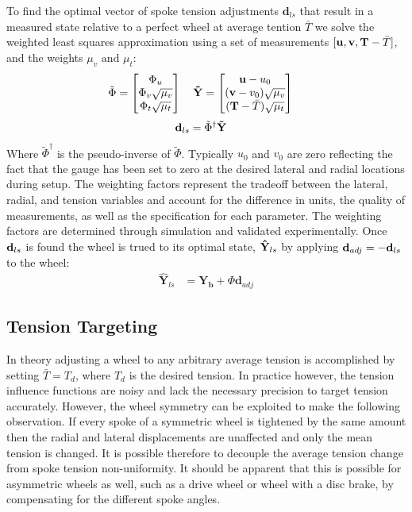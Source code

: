 \documentclass[journal]{IEEEtran}
\begin{document}
To find the optimal vector of spoke tension adjustments $\mathbf{d}_{ls}$ that result in a measured state relative to a perfect wheel at average tention $\bar T$ we solve the weighted least squares approximation using a set of measurements $ [ {\bf u,v,T}-\bar T ]$, and the weights $\mu_v \text{ and }\mu_t$:
\begin{align*}
    \tilde \Phi &= \begin{bmatrix}
    \Phi_u\\
    \Phi_v \sqrt {\mu_v}\\
    \Phi_t \sqrt {\mu_t}
    \end{bmatrix} \quad
    \bf \tilde Y = \begin{bmatrix}
    \mathbf {u} - u_0 \\
   (\mathbf {v}- v_0)  \sqrt {\mu_v}\\
    ( {\bf  T} - \bar T )  \sqrt {\mu_t}
    \end{bmatrix} 
\end{align*}
\begin{align}
        {\bf d}_{ls} &= \tilde \Phi^\dagger {\bf \tilde Y}
        \label{eq:dls}
\end{align}
Where $\tilde \Phi^\dagger$ is the pseudo-inverse of $\tilde \Phi$.  Typically $u_0$ and $v_0$ are zero reflecting the fact that the gauge has been set to zero at the desired lateral and radial locations during setup. The weighting factors represent the tradeoff between the lateral, radial, and tension variables and account for the difference in units, the quality of measurements, as well as the specification for each parameter. The weighting factors are determined through simulation and validated experimentally. Once ${\bf d}_{ls}$ is found the wheel is trued to its optimal state, ${\bf \hat Y}_{ls}$ by applying $\mathbf{d}_{adj} = -{\bf d}_{ls}$ to the wheel:
\begin{align}
\mathbf{\hat Y}_{ls} &= \mathbf{Y_b} + \Phi  \mathbf{d} _{adj}
\label{eq:Yls}
\end{align}

\subsection{Tension Targeting}
In theory adjusting a wheel to any arbitrary average tension is accomplished by setting $\bar T = T_d$, where $T_d$ is the desired tension.  In practice however, the tension influence functions are noisy and lack the necessary precision to target tension accurately.  However, the wheel symmetry can be exploited to make the following observation.  If every spoke of a symmetric wheel is tightened by the same amount then the radial and lateral displacements are unaffected and only the mean tension is changed. It is possible therefore to decouple the average tension change from spoke tension non-uniformity. It should be apparent that this is possible for asymmetric wheels as well, such as a drive wheel or wheel with a disc brake, by compensating for the different spoke angles. 
\end{document}
